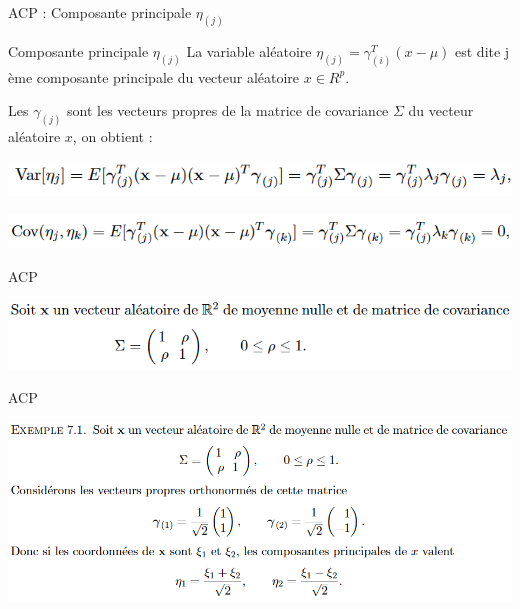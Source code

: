 \documentclass[12pt]{beamer}
\begin{document}
\begin{frame}{ACP : Composante principale $\eta_{(j)}$ }

\begin{block}{Composante principale $\eta_{(j)}$}
La variable aléatoire $\eta_{(j)} = \gamma_{(i)}^T(x-\mu) $ est dite j ème composante principale du vecteur aléatoire $x \in R^p$.
\end{block}


Les $\gamma_{(j)}$ sont les vecteurs propres de la matrice
de covariance $\Sigma$  du vecteur aléatoire $x$, on obtient : 


\includegraphics[scale=0.5]{VarEtaj.png}


\includegraphics[scale=0.45]{CovEtaj.png}



\end{frame}


\begin{frame}{ACP }

\includegraphics[scale=0.4]{ex1.png}

\end{frame}


\begin{frame}{ACP }

\includegraphics[scale=0.39]{ex.png}

\end{frame}
\end{document}
